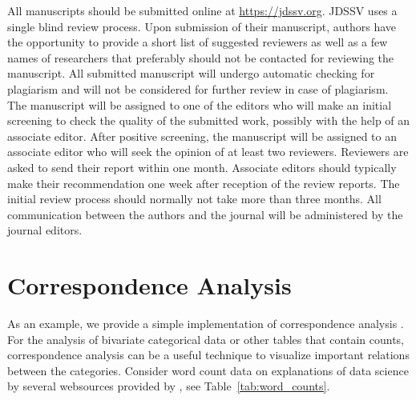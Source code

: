 \documentclass[article]{jdssv}
\begin{document}
All manuscripts should be submitted online at  \url{https://jdssv.org}. JDSSV uses a single blind review process. Upon submission of their manuscript, authors have the opportunity to provide a short list of suggested reviewers as well as a few names of researchers that preferably should not be contacted for reviewing the manuscript.  All submitted manuscript will undergo automatic checking for plagiarism and will not be considered for further review in case of plagiarism. The manuscript will be assigned to one of the editors who will make an initial screening to check the quality of the submitted work, possibly with the help of an associate editor. After positive screening, the manuscript will be assigned to an associate editor who will seek the opinion of at least two reviewers. Reviewers are asked to send their report within one month. Associate editors should typically make their recommendation one week after reception of the review reports. The initial review process should normally not take more than three months. All communication between the authors and the journal will be administered by the journal editors.  




\section{Correspondence Analysis} \label{sec:models}

As an example, we provide a simple implementation of correspondence analysis \citep[see, e.g.,][]{greenacre2010biplots}. For the analysis of bivariate categorical data or other tables that contain counts, correspondence analysis can be a useful technique to visualize important relations between the categories. Consider word count data on explanations of data science by several websources provided by \citet{Lubbe2018}, see Table~\ref{tab:word_counts}.
\end{document}
